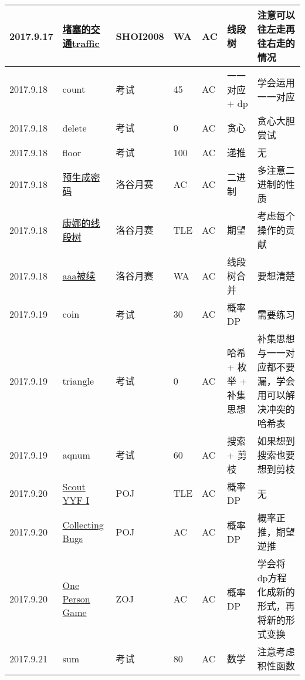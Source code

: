 \documentclass[a4paper]{article}
\begin{document}
\begin{longtable}{|p{1.5cm}|p{2.5cm}|p{1.6cm}|p{1.6cm}|p{1cm}|p{3cm}|p{4cm}|}
		\hline
		2017.9.17 & \href {http://www.lydsy.com/JudgeOnline/problem.php?id=1018}{堵塞的交通traffic}
		 & SHOI2008 & WA & AC & 线段树 & 注意可以往左走再往右走的情况\\
		
		\hline
		2017.9.18 & count
		 & 考试 & 45 & AC & 一一对应 + dp & 学会运用一一对应\\
		
		\hline
		2017.9.18 & delete
		 & 考试 & 0 & AC & 贪心 & 贪心大胆尝试\\
		
		\hline
		2017.9.18 & floor
		 & 考试 & 100 & AC & 递推 & 无\\
		
		\hline
		2017.9.18 & \href {https://www.luogu.org/problem/show?pid=T2}{预生成密码}
		 & 洛谷月赛 & AC & AC & 二进制 & 多注意二进制的性质\\
		
		\hline
		2017.9.18 & \href {https://www.luogu.org/problem/show?pid=3924#sub}{康娜的线段树}
		 & 洛谷月赛 & TLE & AC & 期望 & 考虑每个操作的贡献\\

		\hline
		2017.9.18 & \href {https://www.luogu.org/problem/show?pid=3925}{aaa被续}
		 & 洛谷月赛 & WA & AC & 线段树合并 & 要想清楚\\
		
		\hline
		2017.9.19 & coin
		 & 考试 & 30 & AC & 概率DP & 需要练习\\
		
		\hline
		2017.9.19 & triangle
		 & 考试 & 0 & AC & 哈希 + 枚举 + 补集思想 & 补集思想与一一对应都不要漏，学会用可以解决冲突的哈希表\\
		
		\hline
		2017.9.19 & aqnum
		 & 考试 & 60 & AC & 搜索 + 剪枝 & 如果想到搜索也要想到剪枝\\
		
		\hline
		2017.9.20 & \href {https://vjudge.net/problem/POJ-3744}{Scout YYF I}
		 & POJ & TLE & AC & 概率DP & 无\\
		
		\hline
		2017.9.20 & \href {https://vjudge.net/problem/POJ-2096}{Collecting Bugs}
		 & POJ & AC & AC & 概率DP & 概率正推，期望逆推\\
		
		\hline
		2017.9.20 & \href {https://vjudge.net/problem/ZOJ-3329}{One Person Game}
		 & ZOJ & AC & AC & 概率DP & 学会将dp方程化成新的形式，再将新的形式变换\\
		
		\hline
		2017.9.21 & sum
		 & 考试 & 80 & AC & 数学 & 注意考虑积性函数\\
		

\end{longtable}
\end{document}
